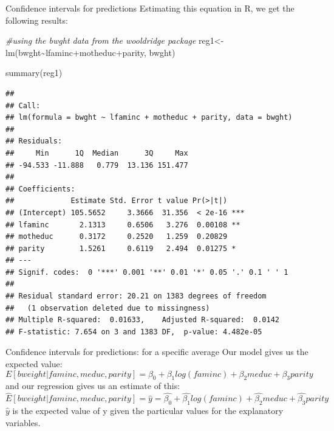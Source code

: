 \documentclass[
  ignorenonframetext,
]{beamer}
\newenvironment{Shaded}{\begin{snugshade}}{\end{snugshade}}
\newcommand{\CommentTok}[1]{\textcolor[rgb]{0.56,0.35,0.01}{\textit{#1}}}
\newcommand{\FunctionTok}[1]{\textcolor[rgb]{0.00,0.00,0.00}{#1}}
\newcommand{\NormalTok}[1]{#1}
\newcommand{\OtherTok}[1]{\textcolor[rgb]{0.56,0.35,0.01}{#1}}
\newcommand{\SpecialCharTok}[1]{\textcolor[rgb]{0.00,0.00,0.00}{#1}}
\begin{document}
\begin{frame}[fragile]{Confidence intervals for predictions}
\protect\hypertarget{confidence-intervals-for-predictions-3}{}
Estimating this equation in R, we get the following results:

\tiny

\begin{Shaded}
\begin{Highlighting}[]
\CommentTok{\#using the bwght data from the wooldridge package}
\NormalTok{reg1}\OtherTok{\textless{}{-}}\FunctionTok{lm}\NormalTok{(bwght}\SpecialCharTok{\textasciitilde{}}\NormalTok{lfaminc}\SpecialCharTok{+}\NormalTok{motheduc}\SpecialCharTok{+}\NormalTok{parity, bwght)}

\FunctionTok{summary}\NormalTok{(reg1)}
\end{Highlighting}
\end{Shaded}

\begin{verbatim}
## 
## Call:
## lm(formula = bwght ~ lfaminc + motheduc + parity, data = bwght)
## 
## Residuals:
##     Min      1Q  Median      3Q     Max 
## -94.533 -11.888   0.779  13.136 151.477 
## 
## Coefficients:
##             Estimate Std. Error t value Pr(>|t|)    
## (Intercept) 105.5652     3.3666  31.356  < 2e-16 ***
## lfaminc       2.1313     0.6506   3.276  0.00108 ** 
## motheduc      0.3172     0.2520   1.259  0.20829    
## parity        1.5261     0.6119   2.494  0.01275 *  
## ---
## Signif. codes:  0 '***' 0.001 '**' 0.01 '*' 0.05 '.' 0.1 ' ' 1
## 
## Residual standard error: 20.21 on 1383 degrees of freedom
##   (1 observation deleted due to missingness)
## Multiple R-squared:  0.01633,    Adjusted R-squared:  0.0142 
## F-statistic: 7.654 on 3 and 1383 DF,  p-value: 4.482e-05
\end{verbatim}
\end{frame}

\begin{frame}{Confidence intervals for predictions: for a specific
average}
\protect\hypertarget{confidence-intervals-for-predictions-for-a-specific-average}{}
Our model gives us the expected value: \small \[
E[bweight|faminc, meduc, parity]=\beta_0+\beta_1log(faminc)+\beta_2meduc+\beta_3parity
\] \normalsize and our regression gives us an estimate of this:
\footnotesize \[
\hat{E}[bweight|faminc, meduc,parity]=\hat{y}=\hat{\beta_0}+\hat{\beta_1}log(faminc)+\hat{\beta_2}meduc+\hat{\beta_3}parity
\] \normalsize \(\hat{y}\) is the expected value of y given the
particular values for the explanatory variables.
\end{frame}
\end{document}
